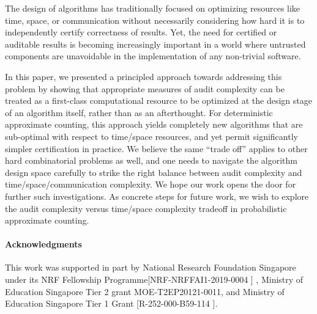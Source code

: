 The design of algorithms has traditionally focused on optimizing
resources like time, space, or communication 
without necessarily considering how hard it is to independently
certify correctness of results.  Yet, the need for certified or
auditable results is becoming increasingly important in a world where
untrusted components are unavoidable in the implementation of any
non-trivial software.

In this paper, we presented a principled
approach towards addressing this problem by showing that appropriate
measures of audit complexity can be treated as a first-class
computational resource to be optimized at the design stage of an
algorithm itself, rather than as an afterthought.  For deterministic
approximate counting, this approach yields completely new algorithms
that are sub-optimal with respect to time/space resources, and yet
permit significantly simpler certification in practice.  We believe
the same ``trade off'' applies to other hard combinatorial problems as
well, and one needs to navigate the algorithm design space carefully
to strike the right balance between audit complexity and
time/space/communication complexity.  We hope our work opens the door
for further such investigations.  As concrete steps for future work,
we wish to explore the audit complexity versus time/space complexity
tradeoff in probabilistic approximate counting.

\paragraph*{Acknowledgments}
This work was supported in part by National Research Foundation Singapore under its NRF Fellowship Programme[NRF-NRFFAI1-2019-0004 ] , Ministry of Education Singapore Tier 2 grant MOE-T2EP20121-0011, and Ministry of Education Singapore Tier 1 Grant [R-252-000-B59-114 ].

